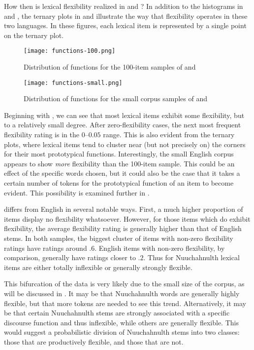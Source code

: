 How then is lexical flexibility realized in  and ? In addition to the histograms in  and , the ternary plots in  and  illustrate the way that flexibility operates in these two languages. In these figures, each lexical item is represented by a single point on the ternary plot.

\begin{figure}[h!]
  \centering
  \caption{Distribution of functions for the 100-item samples of  and }
  \label{fig:ternary-100-items}
  \texttt{[image: functions-100.png]}
\end{figure}

\begin{figure}[h!]
  \centering
  \caption{Distribution of functions for the small corpus samples of  and }
  \label{fig:ternary-small-corpus}
  \texttt{[image: functions-small.png]}
\end{figure}

Beginning with , we can see that most lexical items exhibit some flexibility, but to a relatively small degree. After zero-flexibility cases, the next most frequent flexibility rating is in the $0$–$0.05$ range. This is also evident from the ternary plots, where lexical items tend to cluster near (but not precisely on) the corners for their most prototypical functions. Interestingly, the small English corpus appears to show \emph{more} flexibility than the 100-item sample. This could be an effect of the specific words chosen, but it could also be the case that it takes a certain number of tokens for the prototypical function of an item to become evident. This possibility is examined further in .

 differs from English in several notable ways. First, a much higher proportion of items display no flexibility whatsoever. However, for those items which do exhibit flexibility, the average flexibility rating is generally higher than that of English stems. In both samples, the biggest cluster of items with non-zero flexibility ratings have ratings around $.6$. English items with non-zero flexibility, by comparison, generally have ratings closer to $.2$. Thus for Nuuchahnulth lexical items are either totally inflexible or generally strongly flexible.

This bifurcation of the data is very likely due to the small size of the  corpus, as will be discussed in . It may be that Nuuchahnulth words are generally highly flexible, but that more tokens are needed to see this trend. Alternatively, it may be that certain Nuuchahnulth stems are strongly associated with a specific discourse function and thus inflexible, while others are generally flexible. This would suggest a probabilistic division of Nuuchahnulth stems into two classes: those that are productively flexible, and those that are not.

